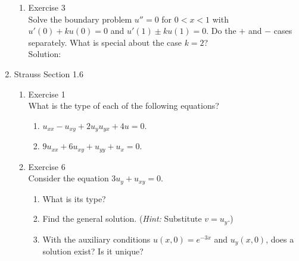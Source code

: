 \documentclass[12pt]{article}%
\begin{document}
\begin{enumerate}
\begin{enumerate}
        \item Exercise 3 \smallskip \\
        Solve the boundary problem $u'' = 0$ for $0 < x < 1$ with $u'\left(0\right) + ku\left(0\right) = 0$ and $u'\left(1\right) \pm ku\left(1\right) = 0$.  Do the $+$ and $-$ cases separately.  What is special about the case $k=2$? \\
        Solution: \\



        
    \end{enumerate}

    \pagebreak
    
    \item Strauss Section 1.6 \smallskip
    \begin{enumerate}
        \item Exercise 1 \smallskip \\
        What is the type of each of the following equations?
        \begin{enumerate}
            \item $u_{xx} - u_{xy} + 2u_y  u_{yx} + 4u = 0$. \smallskip \\

            
            \item $9u_{xx} + 6u_{xy} + u_{yy} + u_x = 0$. \smallskip \\

            
        \end{enumerate}
        \item Exercise 6 \smallskip \\
        Consider the equation $3u_y + u_{xy} =0$.
        \begin{enumerate}
            \item What is its type? \smallskip \\

            
            \item Find the general solution. (\emph{Hint:} Substitute $v = u_y$.) \smallskip \\

            
            \item With the auxiliary conditions $u\left(x,0\right) = e^{-3x}$ and $u_y\left(x,0\right)$, does a solution exist? Is it unique? \smallskip \\

            
        \end{enumerate}
    \end{enumerate}


\end{enumerate}
\end{document}
